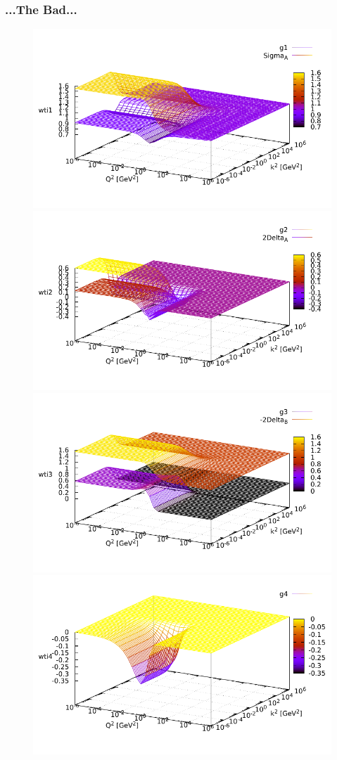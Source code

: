 \begin{frame}
    \frametitle{...The Bad...}
    \begin{figure}
        \centering
        \includegraphics[width=0.45\linewidth]{graphics/wtis/wti1_pv}
        \includegraphics[width=0.45\linewidth]{graphics/wtis/wti2_pv}
        \includegraphics[width=0.45\linewidth]{graphics/wtis/wti3_pv}
        \includegraphics[width=0.45\linewidth]{graphics/wtis/wti4_pv}
        \label{fig:wtis}
    \end{figure}
\end{frame}



